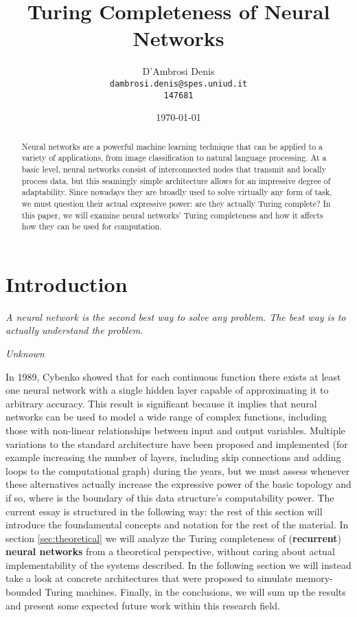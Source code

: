 \documentclass{article}
\title{Turing Completeness of Neural Networks}
\author{D'Ambrosi Denis \\ \small \texttt{dambrosi.denis@spes.uniud.it} \\ \small \texttt{147681}}
\date{\today}
\begin{document}
\maketitle

\begin{abstract}
    Neural networks are a powerful machine learning technique that can be applied to a variety of applications, from image classification to natural language processing. At a basic level, neural networks consist of interconnected nodes that transmit and locally process data, but this seamingly simple architecture allows for an impressive degree of adaptability. Since nowadays they are broadly used to solve virtually any form of task, we must question their actual expressive power: are they actually Turing complete?
    In this paper, we will examine neural networks' Turing completeness and how it affects how they can be used for computation.
\end{abstract}

\tableofcontents

\newpage

\section{Introduction}

\epigraph{\textit{A neural network is the second best way to solve any problem. The best way is to actually understand the problem.}}{\textit{Unknown}}

In 1989, Cybenko \cite{CYB89} showed that for each continuous function there exists at least one neural network with a single hidden layer capable of approximating it to arbitrary accuracy. This result is significant because it implies that neural networks can be used to model a wide range of complex functions, including those with non-linear relationships between input and output variables. 
Multiple variations to the standard architecture have been proposed and implemented (for example increasing the number of layers, including skip connections and adding loops to the computational graph) during the years, but we must assess whenever these alternatives actually increase the expressive power of the basic topology and if so, where is the boundary of this data structure's computability power.
The current essay is structured in the following way: the rest of this section will introduce the foundamental concepts and notation for the rest of the material. In section \ref{sec:theoretical} we will analyze the Turing completeness of (\textbf{recurrent}) \textbf{neural networks} from a theoretical perspective, without caring about actual implementability of the systems described. In the following section we will instead take a look at concrete architectures that were proposed to simulate memory-bounded Turing machines. Finally, in the conclusions, we will sum up the results and present some expected future work within this research field.
\end{document}
